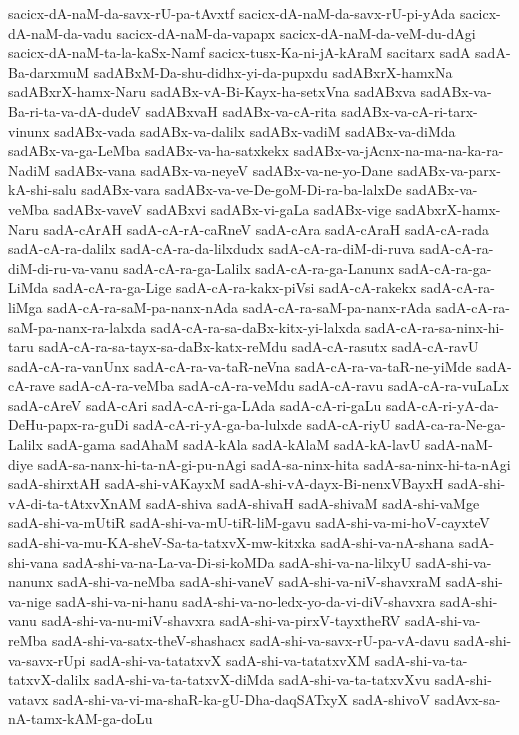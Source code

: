 {sacicx-dA-naM-da-savx-rU-pa-tAvxtf
sacicx-dA-naM-da-savx-rU-pi-yAda
sacicx-dA-naM-da-vadu
sacicx-dA-naM-da-vapapx
sacicx-dA-naM-da-veM-du-dAgi
sacicx-dA-naM-ta-la-kaSx-Namf
sacicx-tusx-Ka-ni-jA-kAraM
sacitarx
sadA
sadA-Ba-darxmuM
sadABxM-Da-shu-didhx-yi-da-pupxdu
sadABxrX-hamxNa
sadABxrX-hamx-Naru
sadABx-vA-Bi-Kayx-ha-setxVna
sadABxva
sadABx-va-Ba-ri-ta-va-dA-dudeV
sadABxvaH
sadABx-va-cA-rita
sadABx-va-cA-ri-tarx-vinunx
sadABx-vada
sadABx-va-dalilx
sadABx-vadiM
sadABx-va-diMda
sadABx-va-ga-LeMba
sadABx-va-ha-satxkekx
sadABx-va-jAcnx-na-ma-na-ka-ra-NadiM
sadABx-vana
sadABx-va-neyeV
sadABx-va-ne-yo-Dane
sadABx-va-parx-kA-shi-salu
sadABx-vara
sadABx-va-ve-De-goM-Di-ra-ba-lalxDe
sadABx-va-veMba
sadABx-vaveV
sadABxvi
sadABx-vi-gaLa
sadABx-vige
sadAbxrX-hamx-Naru
sadA-cArAH
sadA-cA-rA-caRneV
sadA-cAra
sadA-cAraH
sadA-cA-rada
sadA-cA-ra-dalilx
sadA-cA-ra-da-lilxdudx
sadA-cA-ra-diM-di-ruva
sadA-cA-ra-diM-di-ru-va-vanu
sadA-cA-ra-ga-Lalilx
sadA-cA-ra-ga-Lanunx
sadA-cA-ra-ga-LiMda
sadA-cA-ra-ga-Lige
sadA-cA-ra-kakx-piVsi
sadA-cA-rakekx
sadA-cA-ra-liMga
sadA-cA-ra-saM-pa-nanx-nAda
sadA-cA-ra-saM-pa-nanx-rAda
sadA-cA-ra-saM-pa-nanx-ra-lalxda
sadA-cA-ra-sa-daBx-kitx-yi-lalxda
sadA-cA-ra-sa-ninx-hi-taru
sadA-cA-ra-sa-tayx-sa-daBx-katx-reMdu
sadA-cA-rasutx
sadA-cA-ravU
sadA-cA-ra-vanUnx
sadA-cA-ra-va-taR-neVna
sadA-cA-ra-va-taR-ne-yiMde
sadA-cA-rave
sadA-cA-ra-veMba
sadA-cA-ra-veMdu
sadA-cA-ravu
sadA-cA-ra-vuLaLx
sadA-cAreV
sadA-cAri
sadA-cA-ri-ga-LAda
sadA-cA-ri-gaLu
sadA-cA-ri-yA-da-DeHu-papx-ra-guDi
sadA-cA-ri-yA-ga-ba-lulxde
sadA-cA-riyU
sadA-ca-ra-Ne-ga-Lalilx
sadA-gama
sadAhaM
sadA-kAla
sadA-kAlaM
sadA-kA-lavU
sadA-naM-diye
sadA-sa-nanx-hi-ta-nA-gi-pu-nAgi
sadA-sa-ninx-hita
sadA-sa-ninx-hi-ta-nAgi
sadA-shirxtAH
sadA-shi-vAKayxM
sadA-shi-vA-dayx-Bi-nenxVBayxH
sadA-shi-vA-di-ta-tAtxvXnAM
sadA-shiva
sadA-shivaH
sadA-shivaM
sadA-shi-vaMge
sadA-shi-va-mUtiR
sadA-shi-va-mU-tiR-liM-gavu
sadA-shi-va-mi-hoV-cayxteV
sadA-shi-va-mu-KA-sheV-Sa-ta-tatxvX-mw-kitxka
sadA-shi-va-nA-shana
sadA-shi-vana
sadA-shi-va-na-La-va-Di-si-koMDa
sadA-shi-va-na-lilxyU
sadA-shi-va-nanunx
sadA-shi-va-neMba
sadA-shi-vaneV
sadA-shi-va-niV-shavxraM
sadA-shi-va-nige
sadA-shi-va-ni-hanu
sadA-shi-va-no-ledx-yo-da-vi-diV-shavxra
sadA-shi-vanu
sadA-shi-va-nu-miV-shavxra
sadA-shi-va-pirxV-tayxtheRV
sadA-shi-va-reMba
sadA-shi-va-satx-theV-shashacx
sadA-shi-va-savx-rU-pa-vA-davu
sadA-shi-va-savx-rUpi
sadA-shi-va-tatatxvX
sadA-shi-va-tatatxvXM
sadA-shi-va-ta-tatxvX-dalilx
sadA-shi-va-ta-tatxvX-diMda
sadA-shi-va-ta-tatxvXvu
sadA-shi-vatavx
sadA-shi-va-vi-ma-shaR-ka-gU-Dha-daqSATxyX
sadA-shivoV
sadAvx-sa-nA-tamx-kAM-ga-doLu
}
